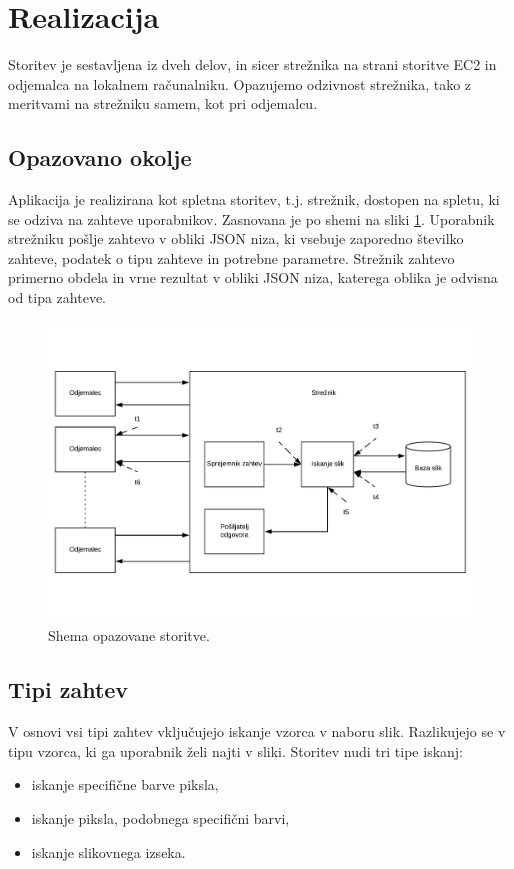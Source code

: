 \section{Realizacija}

Storitev je sestavljena iz dveh delov, in sicer strežnika na strani storitve EC2 in odjemalca na lokalnem računalniku.
Opazujemo odzivnost strežnika, tako z meritvami na strežniku samem, kot pri odjemalcu.

\subsection{Opazovano okolje}

Aplikacija je realizirana kot spletna storitev, t.j. strežnik, dostopen na spletu, ki se odziva na zahteve uporabnikov.
Zasnovana je po shemi na sliki \ref{fig:1_osnovnaShema}.
Uporabnik strežniku pošlje zahtevo v obliki JSON niza, ki vsebuje zaporedno številko zahteve, podatek o tipu zahteve in potrebne parametre.
Strežnik zahtevo primerno obdela in vrne rezultat v obliki JSON niza, katerega oblika je odvisna od tipa zahteve.

\begin{figure}[H]
\centering
\includegraphics[scale=0.4]{Img/1_shema.pdf}
\caption{Shema opazovane storitve.}
\label{fig:1_osnovnaShema}
\end{figure}

\subsection{Tipi zahtev}

V osnovi vsi tipi zahtev vključujejo iskanje vzorca v naboru slik.
Razlikujejo se v tipu vzorca, ki ga uporabnik želi najti v sliki.
Storitev nudi tri tipe iskanj:
\begin{itemize}
\item iskanje specifične barve piksla,
\item iskanje piksla, podobnega specifični barvi,
\item iskanje slikovnega izseka.
\end{itemize}

